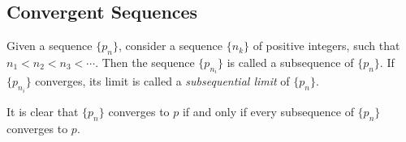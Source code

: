 \documentclass[../poma-notes.tex]{subfiles}
\begin{document}
\subsection*{Convergent Sequences}

\begin{definition}
  Given a sequence $\{p_n\}$, consider a sequence $\{n_k\}$ of positive integers, such that $n_1 < n_2 < n_3 < \cdots$.
  Then the sequence $\{p_{n_i}\}$ is called a subsequence of $\{p_n\}$. If $\{p_{n_i}\}$ converges, its limit is called
  a \textit{subsequential limit} of $\{p_n\}$.

  It is clear that $\{p_n\}$ converges to $p$ if and only if every subsequence of $\{p_n\}$ converges to $p$.
\end{definition}
\end{document}
